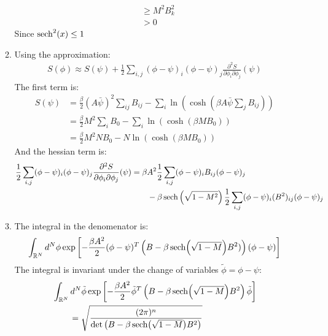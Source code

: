 \documentclass[12pt,a4]{article}
\begin{document}
\begin{enumerate}
\begin{enumerate}
\begin{align*}
                                                                  & \geq  M^2 B_{k}^2 \\
                                                                  & >  0 
        \end{align*}
        Since $\sech^2(x) \leq 1$
      \item
        Using the approximation:
        \begin{align*}
          S(\phi) \approx S(\psi) + \frac{1}{2}\sum_{i,j}(\phi - \psi)_i (\phi - \psi)_j \frac{\partial^2 S}{\partial \phi_i \partial \phi_j}(\psi)
        \end{align*}
        The first term is:
        \begin{align*}
          S(\psi) &= \frac{\beta}{2} (A\bar{\psi})^2 \sum_{i j} B_{ij} - \sum_i \ln(\cosh(\beta A\bar{\psi}\sum_jB_{ij}))\\
                  &= \frac{\beta}{2} M^2 \sum_{i } B_{0} - \sum_i \ln(\cosh(\beta M B_0))\\
                  &= \frac{\beta}{2} M^2 N B_{0} - N \ln(\cosh(\beta M B_0))
        \end{align*}
        And the hessian term is:
        \begin{align*}
          \frac{1}{2}\sum_{i,j}(\phi - \psi)_i (\phi - \psi)_j \frac{\partial^2 S}{\partial \phi_i \partial \phi_j}(\psi) &= \beta A^2  \frac{1}{2}\sum_{i,j}(\phi - \psi)_i B_{ij} (\phi - \psi)_j  \\
               & \qquad   - \beta \sech\left(\sqrt{1 - M^2}\right) \frac{1}{2}\sum_{i,j} (\phi - \psi)_i (B^2)_{ij} (\phi - \psi)_j
        \end{align*}
      \item
        The integral in the denomenator is:
        \begin{align*}
          \int_{\mathbb{R}^N} d^N\phi \exp\left[-\frac{\beta A^2}{2}(\phi - \psi)^T\left(B  - \beta \sech (\sqrt{1 - M})B^2)\right) (\phi - \psi)\right]
        \end{align*}
        The integral is invariant under the change of variables $\tilde\phi = \phi - \psi$:
        \begin{align*}
          &\int_{\mathbb{R}^N} d^N\tilde\phi \exp\left[-\frac{\beta A^2}{2}\tilde\phi^T\left(B  - \beta \sech (\sqrt{1 - M})B^2\right) \tilde\phi\right]\\
          & \qquad = \sqrt{\frac{(2 \pi)^n}{\det\left( B  - \beta \sech (\sqrt{1 - M})B^2\right)}}
        \end{align*}
    \end{enumerate}
\end{enumerate}
\end{document}
